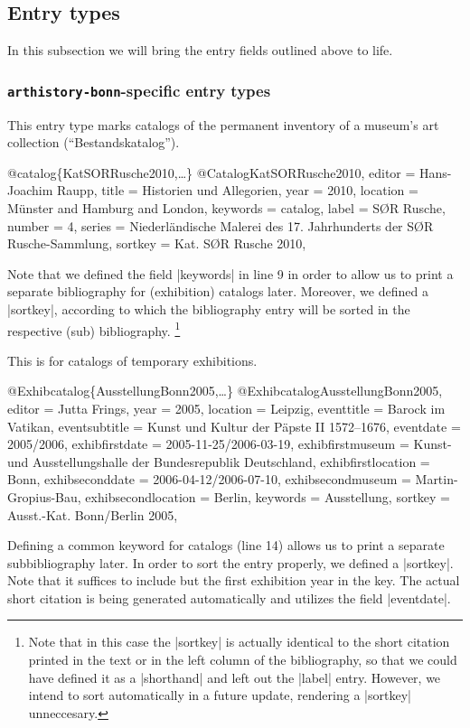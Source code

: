 \documentclass[a4paper,
10pt,
ngerman,
english
]{ltxdoc}
\begin{document}
\subsection{Entry types}

In this subsection we will bring the entry fields outlined above to life.

\subsubsection{\texttt{arthistory-bonn}-specific entry types}\label{sec:arth-etypes}

This entry type marks catalogs of the permanent inventory of a museum's art collection (\enquote{Bestandskatalog}).
\begin{bibexample}[label=KatSORRusche2010]{{@}catalog\{KatSORRusche2010,…\}}
@Catalog{KatSORRusche2010,
  editor   = {Hans-Joachim Raupp},
  title    = {Historien und Allegorien},
  year     = {2010},
  location = {Münster and Hamburg and London},
  keywords = {catalog},
  label    = {S{{\O}}R Rusche},
  number   = {4},
  series   = {Niederländische Malerei des 17. Jahrhunderts der S{{\O}}R Rusche-Sammlung},
  sortkey  = {Kat. S{{\O}}R Rusche 2010},
}
\end{bibexample}
Note that we defined the field |keywords| in line 9 in order to allow us to print a separate bibliography for (exhibition) catalogs later.
Moreover, we defined a |sortkey|, according to which the bibliography entry will be sorted in the respective (sub) bibliography.%
\footnote{Note that in this case the |sortkey| is actually identical to the short citation printed in the text or in the left column of the bibliography, so that we could have defined it as a |shorthand| and left out the |label| entry. However, we intend to sort automatically in a future update, rendering a |sortkey| unneccesary.}

This is for catalogs of temporary exhibitions.
\begin{bibexample}[label=AusstellungBonn2005]{{@}Exhibcatalog\{AusstellungBonn2005,…\}}
@Exhibcatalog{AusstellungBonn2005,
  editor          = {Jutta Frings},
  year            = {2005},
  location        = {Leipzig},
  eventtitle      = {Barock im Vatikan},
  eventsubtitle   = {Kunst und Kultur der Päpste II 1572--1676},
  eventdate       = {2005/2006},
  exhibfirstdate  = {2005-11-25/2006-03-19},
  exhibfirstmuseum = {Kunst- und Ausstellungshalle der Bundesrepublik Deutschland},
  exhibfirstlocation = {Bonn},
  exhibseconddate = {2006-04-12/2006-07-10},
  exhibsecondmuseum = {Martin-Gropius-Bau},
  exhibsecondlocation = {Berlin},
  keywords        = {Ausstellung},
  sortkey         = {Ausst.-Kat. Bonn/Berlin 2005},
}
\end{bibexample}
Defining a common keyword for catalogs (line 14) allows us to print a separate subbibliography later. In order to sort the entry properly, we defined a |sortkey|. 
Note that it suffices to include but the first exhibition year in the key. The actual short citation is being generated automatically and utilizes the field |eventdate|.
\end{document}
